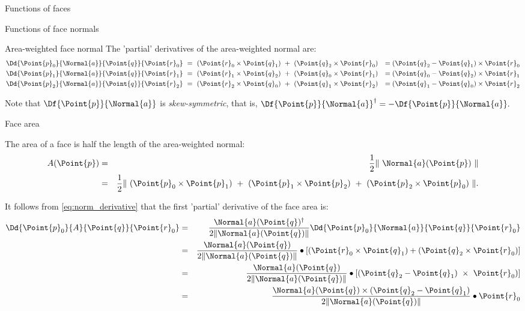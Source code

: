 \begin{plSection}{Functions of faces}
\begin{plSection}{Functions of face normals}
\begin{plSection}{Area-weighted face normal}
The 'partial' derivatives of the area-weighted normal are:
\begin{eqnarray}
\Dd{\Point{p}_0}{\Normal{a}}{\Point{q}}{\Point{r}_0} \
& = \ (\Point{r}_0 \times \Point{q}_1) \ + \ (\Point{q}_2 \times \Point{r}_0) & = (\Point{q}_2 - \Point{q}_1) \times \Point{r}_0 \\
\Dd{\Point{p}_1}{\Normal{a}}{\Point{q}}{\Point{r}_1} \
& = \ (\Point{r}_1 \times \Point{q}_2) \ + \ (\Point{q}_0 \times \Point{r}_1) & = (\Point{q}_0 - \Point{q}_2) \times \Point{r}_1 \nonumber \\
\Dd{\Point{p}_2}{\Normal{a}}{\Point{q}}{\Point{r}_2} \
& = \ (\Point{r}_2 \times \Point{q}_0) \ + \ (\Point{q}_1 \times \Point{r}_2) & = (\Point{q}_1 - \Point{q}_0) \times \Point{r}_2 \nonumber
\end{eqnarray}

Note that $\Df{\Point{p}}{\Normal{a}}$ is {\it skew-symmetric}, that is,
$\Df{\Point{p}}{\Normal{a}}^{\dagger} = -\Df{\Point{p}}{\Normal{a}}.$

\end{plSection}%
\begin{plSection}{Face area}
\label{sec:facearea}

The area of a face is half the length of the area-weighted normal:
\begin{eqnarray}
A(\Point{p})
& = & \frac{1}{2} \| \ \Normal{a}(\Point{p}) \ \|  \\
& = & \frac{1}{2} \| \ (\Point{p}_0 \times \Point{p}_1) \ + \ (\Point{p}_1 \times \Point{p}_2) \ + \ (\Point{p}_2 \times \Point{p}_0) \ \|.
\nonumber
\end{eqnarray}

It follows from \cref{eq:norm_derivative}
that the first 'partial' derivative of the face area is:
\begin{eqnarray}
\label{eq:area_partial_derivative}
\Dd{\Point{p}_0}{A}{\Point{q}}{\Point{r}_0}
& = &
\frac{\Normal{a}(\Point{q})^\dagger}{2\|\Normal{a}(\Point{q})\|}
{\Dd{\Point{p}_0}{\Normal{a}}{\Point{q}}{\Point{r}_0}}  \\
& = &
\frac{\Normal{a}(\Point{q})}{2\|\Normal{a}(\Point{q})\|}
\bullet
\left[(\Point{r}_0 \times \Point{q}_1) + (\Point{q}_2 \times \Point{r}_0)\right] \nonumber \\
& = &
\frac{\Normal{a}(\Point{q})}{2\|\Normal{a}(\Point{q})\|}
\bullet
\left[(\Point{q}_2 - \Point{q}_1) \ \times \  \Point{r}_0)\right] \nonumber \\
& = &
\frac{\Normal{a}(\Point{q}) \times (\Point{q}_2 - \Point{q}_1)}{2\|\Normal{a}(\Point{q})\|}
\bullet
\Point{r}_0 \nonumber
\end{eqnarray}


\end{plSection}
\end{plSection}
\end{plSection}
